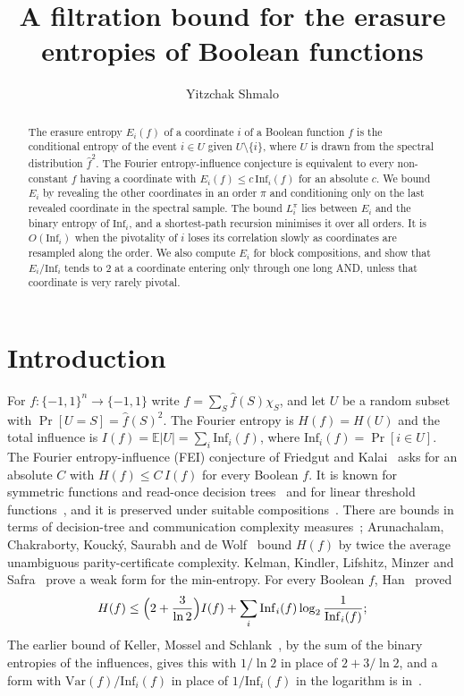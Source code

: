\documentclass[11pt]{amsart}
\title{A filtration bound for the erasure entropies of Boolean functions}
\author{Yitzchak Shmalo}
\date{}
\theoremstyle{remark}
\newcommand{\Inf}{\mathrm{Inf}}
\newcommand{\Var}{\mathrm{Var}}
\newcommand{\E}{\mathbb{E}}
\begin{document}
\begin{abstract}
The erasure entropy $E_i(f)$ of a coordinate $i$ of a Boolean function $f$ is the conditional entropy of the event
$i\in U$ given $U\setminus\{i\}$, where $U$ is drawn from the spectral distribution $\hat f^2$. The Fourier
entropy-influence conjecture is equivalent to every non-constant $f$ having a coordinate with $E_i(f)\le c\,\Inf_i(f)$
for an absolute $c$. We bound $E_i$ by revealing the other coordinates in an order $\pi$ and conditioning only on the
last revealed coordinate in the spectral sample. The bound $L^\pi_i$ lies between $E_i$ and the binary entropy of
$\Inf_i$, and a shortest-path recursion minimises it over all orders. It is $O(\Inf_i)$ when the pivotality of $i$
loses its correlation slowly as coordinates are resampled along the order. We also compute $E_i$ for block
compositions, and show that $E_i/\Inf_i$ tends to $2$ at a coordinate entering only through one long AND, unless that
coordinate is very rarely pivotal.
\end{abstract}


\maketitle

\section{Introduction}\label{sec:intro}

For $f\colon\{-1,1\}^n\to\{-1,1\}$ write $f=\sum_S\hat f(S)\chi_S$, and let $U$ be a random subset with
$\Pr[U=S]=\hat f(S)^2$. The Fourier entropy is $H(f)=H(U)$ and the total influence is $I(f)=\E|U|=\sum_i\Inf_i(f)$, where
$\Inf_i(f)=\Pr[i\in U]$. The Fourier entropy-influence (FEI) conjecture of Friedgut and Kalai~\cite{FK96} asks for an
absolute $C$ with $H(f)\le C\,I(f)$ for every Boolean $f$. It is known for symmetric functions and read-once
decision trees~\cite{OWZ11} and for linear threshold functions~\cite{ShmLTF}, and it is preserved under suitable
compositions~\cite{OT13}. There are bounds in terms
of decision-tree and communication complexity measures~\cite{CKLS,WWW}; Arunachalam, Chakraborty, Kouck\'y, Saurabh
and de Wolf~\cite{ACKSW} bound $H(f)$ by twice the average unambiguous parity-certificate complexity. Kelman, Kindler,
Lifshitz, Minzer and Safra~\cite{KKLMS} prove a weak form for the min-entropy. For every Boolean $f$,
Han~\cite{Han} proved
\[
H(f)\le\Bigl(2+\frac{3}{\ln 2}\Bigr)I(f)+\sum_i\Inf_i(f)\log_2\frac{1}{\Inf_i(f)};
\]
The earlier bound of Keller, Mossel and Schlank~\cite[Claim~4.1]{KMS}, by the sum of the binary entropies of the influences, gives this with $1/\ln 2$ in place of $2+3/\ln 2$, and a form with $\Var(f)/\Inf_i(f)$ in place of $1/\Inf_i(f)$ in the logarithm is in~\cite{Shm4}.
\end{document}
